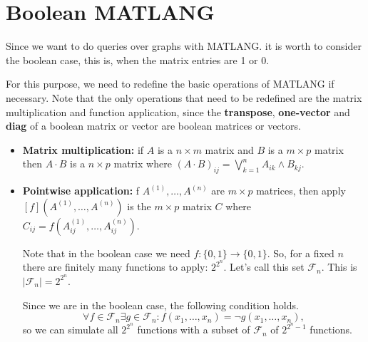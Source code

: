 \section{Boolean MATLANG}

Since we want to do queries over graphs with MATLANG. it is worth to consider the boolean case, this is, when the matrix entries are 1 or 0.

For this purpose, we need to redefine the basic operations of MATLANG if necessary. Note that the only operations that need to be redefined are the matrix multiplication and function application, since the \textbf{transpose}, \textbf{one-vector} and \textbf{diag} of a boolean matrix or vector are boolean matrices or vectors.

\begin{itemize}
	\item \textbf{Matrix multiplication:} if $A$ is a $n\times m$ matrix and $B$ is a $m\times p$ matrix then $A\cdot B$ is a $n\times p$ matrix where $(A\cdot B)_{ij}=\bigvee_{k=1}^n A_{ik}\wedge B_{kj}$.
	\item \textbf{Pointwise application:} f $A^{(1)}, \ldots, A^{(n)}$ are $m\times p$ matrices, then apply$\left[ f \right](A^{(1)}, \ldots, A^{(n)})$ is the $m\times p$ matrix $C$ where $C_{ij}=f(A^{(1)}_{ij}, \ldots, A^{(n)}_{ij})$.
	
	Note that in the boolean case we need $f:\lbrace 0,1\rbrace\rightarrow\lbrace 0,1\rbrace$. So, for a fixed $n$ there are finitely many functions to apply: $2^{2^n}$. Let's call this set $\mathcal{F}_n$. This is $|\mathcal{F}_n|=2^{2^{n}}$.
	
	Since we are in the boolean case, the following condition holds. $$\forall f\in\mathcal{F}_n\exists g\in\mathcal{F}_n: f(x_{1}, \ldots, x_{n}) = \neg g(x_{1}, \ldots, x_{n}),$$ so we can simulate all $2^{2^n}$ functions with a subset of $\mathcal{F}_n$ of $2^{2^n - 1}$ functions.
\end{itemize}